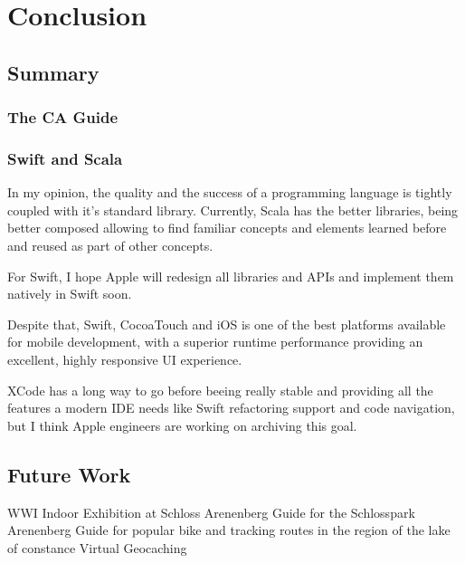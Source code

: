 
\chapter{Conclusion} %

\label{conclusion} %



\section{Summary}

\subsection{The CA Guide}

\subsection{Swift and Scala}

In my opinion, the quality and the success of a programming language is tightly coupled with it's standard library. Currently, Scala has the better libraries, being better composed allowing to find familiar concepts and elements learned before and reused as part of other concepts. %


For Swift, I hope Apple will redesign all libraries and APIs and implement them natively in Swift soon. 

Despite that, Swift, CocoaTouch and iOS is one of the best platforms available for mobile development, with a superior runtime performance providing an excellent, highly responsive UI experience. %

XCode has a long way to go before beeing really stable and providing all the features a modern IDE needs like Swift refactoring support and code navigation, but I think Apple engineers are working on archiving this goal.

\section{Future Work}

WWI Indoor Exhibition at Schloss Arenenberg
Guide for the Schlosspark Arenenberg
Guide for popular bike and tracking routes in the region of the lake of constance
Virtual Geocaching